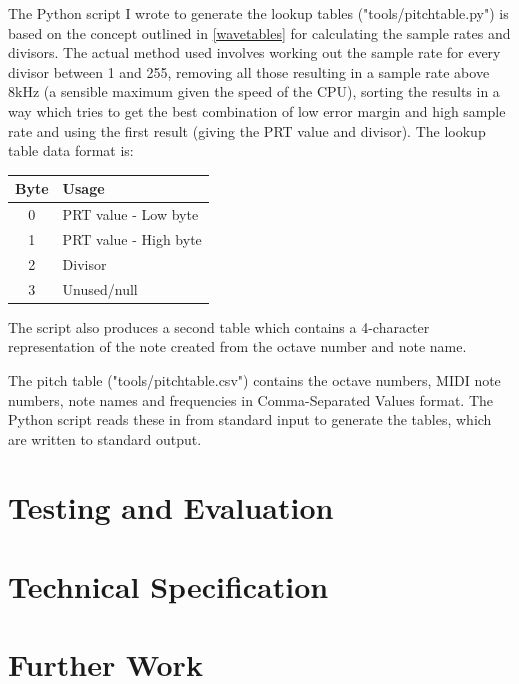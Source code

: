 \documentclass[a4paper,10pt]{article}
\begin{document}
The Python script I wrote to generate the lookup tables ("tools/pitchtable.py") is based on the 
concept outlined in \ref{wavetables} for calculating the sample rates and divisors.  The actual 
method used involves working out the sample rate for every divisor between 1 and 255, removing all 
those resulting in a sample rate above 8kHz (a sensible maximum given the speed of the CPU), sorting 
the results in a way which tries to get the best combination of low error margin and high sample 
rate and using the first result (giving the PRT value and divisor).  The lookup table data format 
is:

\begin{center}
\begin{tabular}{c l}
Byte & Usage\\
\hline
0 & PRT value - Low byte\\
1 & PRT value - High byte\\
2 & Divisor\\
3 & Unused/null\\
\end{tabular}
\end{center}

The script also produces a second table which contains a 4-character representation of the note 
created from the octave number and note name.

The pitch table ("tools/pitchtable.csv") contains the octave numbers, MIDI note numbers, note names 
and frequencies in Comma-Separated Values format.  The Python script reads these in from standard 
input to generate the tables, which are written to standard output.

\pagebreak
\section{Testing and Evaluation}

\pagebreak
\section{Technical Specification}

\pagebreak
\section{Further Work}


\appendix

\pagebreak
\begin{thebibliography}{99}
\end{thebibliography}
\end{document}
